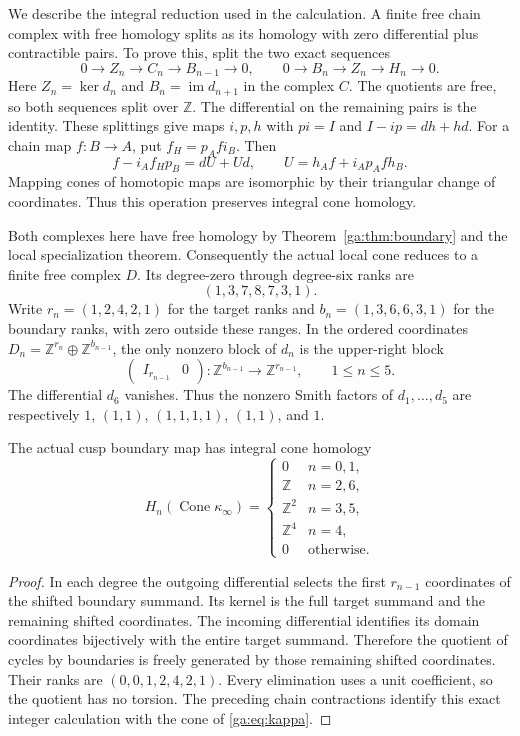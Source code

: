 We describe the integral reduction used in the calculation.
A finite free chain complex with free homology splits as its homology
with zero differential plus contractible pairs.
To prove this, split the two exact sequences
\[
0\to Z_n\to C_n\to B_{n-1}\to0,
\qquad 0\to B_n\to Z_n\to H_n\to0.
\]
Here $Z_n=\ker d_n$ and $B_n=\operatorname{im}d_{n+1}$ in the complex $C$.
The quotients are free, so both sequences split over $\mathbb Z$.
The differential on the remaining pairs is the identity.
These splittings give maps $i,p,h$ with $pi=I$ and $I-ip=dh+hd$.
For a chain map $f:B\to A$, put $f_H=p_Afi_B$.
Then
\[
f-i_Af_Hp_B=dU+Ud,\qquad U=h_Af+i_Ap_Afh_B.
\]
Mapping cones of homotopic maps are isomorphic by their triangular
change of coordinates. Thus this operation preserves integral cone homology.

Both complexes here have free homology by Theorem~\ref{ga:thm:boundary}
and the local specialization theorem.
Consequently the actual local cone reduces to a finite free complex $D$.
Its degree-zero through degree-six ranks are
\begin{equation}\label{ga:eq:ranks}
(1,3,7,8,7,3,1).
\end{equation}
Write $r_n=(1,2,4,2,1)$ for the target ranks and
$b_n=(1,3,6,6,3,1)$ for the boundary ranks, with zero outside these ranges.
In the ordered coordinates $D_n=\mathbb Z^{r_n}\oplus\mathbb Z^{b_{n-1}}$,
the only nonzero block of $d_n$ is the upper-right block
\begin{equation}\label{ga:eq:reduced-d}
\begin{pmatrix}I_{r_{n-1}}&0\end{pmatrix}
:\mathbb Z^{b_{n-1}}\longrightarrow\mathbb Z^{r_{n-1}},
\qquad 1\leq n\leq5.
\end{equation}
The differential $d_6$ vanishes.
Thus the nonzero Smith factors of $d_1,\ldots,d_5$ are respectively
$1$, $(1,1)$, $(1,1,1,1)$, $(1,1)$, and $1$.

\begin{theorem}\label{ga:thm:relative}
The actual cusp boundary map has integral cone homology
\[
H_n(\operatorname{Cone}\kappa_\infty)=
\begin{cases}
0&n=0,1,\\
\mathbb Z&n=2,6,\\
\mathbb Z^2&n=3,5,\\
\mathbb Z^4&n=4,\\
0&\text{otherwise}.
\end{cases}
\]
\end{theorem}
\begin{proof}
In each degree the outgoing differential selects the first $r_{n-1}$
coordinates of the shifted boundary summand.
Its kernel is the full target summand and the remaining shifted coordinates.
The incoming differential identifies its domain coordinates bijectively
with the entire target summand. Therefore the quotient of cycles by
boundaries is freely generated by those remaining shifted coordinates.
Their ranks are $(0,0,1,2,4,2,1)$.
Every elimination uses a unit coefficient, so the quotient has no torsion.
The preceding chain contractions identify this exact integer calculation
with the cone of \eqref{ga:eq:kappa}.
\end{proof}

